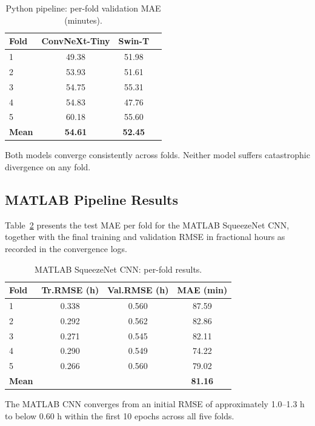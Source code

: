 \documentclass[9pt, a4paper, twocolumn]{article}
\begin{document}
\begin{table}[H]
\centering
\footnotesize
\caption{Python pipeline: per-fold validation MAE (minutes).}
\label{tab:python_results}
\begin{tabular}{lccc}
\toprule
\textbf{Fold} & \textbf{ConvNeXt-Tiny} & \textbf{Swin-T} \\
\midrule
1 & 49.38 & 51.98 \\
2 & 53.93 & 51.61 \\
3 & 54.75 & 55.31 \\
4 & 54.83 & 47.76 \\
5 & 60.18 & 55.60 \\
\midrule
\textbf{Mean} & \textbf{54.61} & \textbf{52.45} \\
\bottomrule
\end{tabular}
\end{table}

Both models converge consistently across folds. Neither model suffers catastrophic divergence on any fold.


\subsection{MATLAB Pipeline Results}

Table~\ref{tab:matlab_results} presents the test MAE per fold for the MATLAB SqueezeNet CNN, together with the final training and validation RMSE in fractional hours as recorded in the convergence logs.

\begin{table}[H]
\centering
\footnotesize
\caption{MATLAB SqueezeNet CNN: per-fold results.}
\label{tab:matlab_results}
\begin{tabular}{lccc}
\toprule
\textbf{Fold} & \textbf{Tr.RMSE (h)} & \textbf{Val.RMSE (h)} & \textbf{MAE (min)} \\
\midrule
1 & 0.338 & 0.560 & 87.59 \\
2 & 0.292 & 0.562 & 82.86 \\
3 & 0.271 & 0.545 & 82.11 \\
4 & 0.290 & 0.549 & 74.22 \\
5 & 0.266 & 0.560 & 79.02 \\
\midrule
\textbf{Mean} & & & \textbf{81.16} \\
\bottomrule
\end{tabular}
\end{table}



The MATLAB CNN converges from an initial RMSE of approximately 1.0--1.3 h to below 0.60 h within the first 10 epochs across all five folds.
\end{document}
